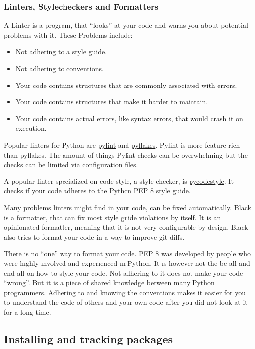 \documentclass{article}
\begin{document}
\subsubsection{Linters, Stylecheckers and Formatters}

A Linter is a program, that ``looks'' at your code and warns you about potential
problems with it. These Problems include:
\begin{itemize}
    \item Not adhering to a style guide.
    \item Not adhering to conventions.
    \item Your code contains structures that are commonly associated with errors.
    \item Your code contains structures that make it harder to maintain.
    \item Your code contains actual errors, like syntax errors, that would crash it on execution.
\end{itemize}

Popular linters for Python are \href{https://github.com/PyCQA/pylint}{pylint} and
\href{https://github.com/PyCQA/pyflakes}{pyflakes}.
Pylint is more feature rich than pyflakes.
The amount of things Pylint checks can be overwhelming but the checks can be limited
via configuration files.

A popular linter specialized on code style, a style checker,
is \href{https://github.com/PyCQA/pycodestyle}{pycodestyle}.
It checks if your code adheres to the Python
\href{https://www.python.org/dev/peps/pep-0008/}{PEP 8} style guide.

Many problems linters might find in your code, can be fixed automatically.
Black is a formatter, that can fix most style guide violations by itself.
It is an opinionated formatter, meaning that it is not very configurable by design.
Black also tries to format your code in a way to improve git diffs.

There is no ``one'' way to format your code.
PEP 8 was developed by people who were highly involved and experienced in Python.
It is however not the be-all and end-all on how to style your code.
Not adhering to it does not make your code ``wrong''.
But it is a piece of shared knowledge between many Python programmers.
Adhering to and knowing the conventions makes it easier for you to understand
the code of others and your own code after you did not look at it for a long time.

\subsection{Installing and tracking packages}
\end{document}
